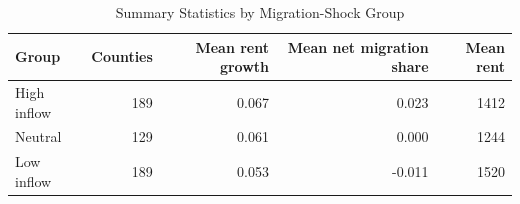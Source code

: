 \begin{table}[!htbp]\centering
\caption{Summary Statistics by Migration-Shock Group}\label{tab:summary_by_group}
\begin{tabular}{lrrrr}\toprule
Group & Counties & Mean rent growth & Mean net migration share & Mean rent \\
\midrule
High inflow & 189 & 0.067 & 0.023 & 1412 \\
Neutral & 129 & 0.061 & 0.000 & 1244 \\
Low inflow & 189 & 0.053 & -0.011 & 1520 \\
\bottomrule
\end{tabular}
\end{table}
